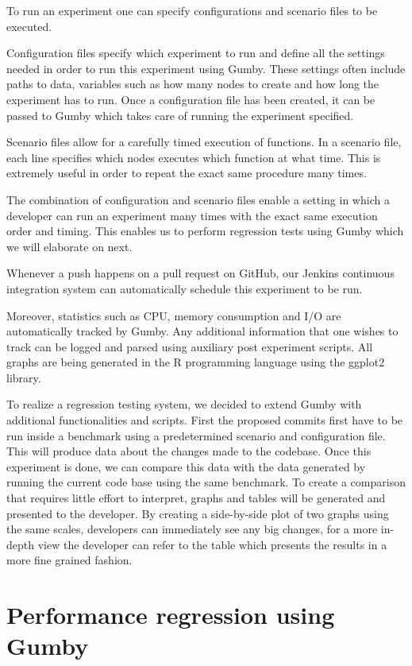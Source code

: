 To run an experiment one can specify configurations and scenario files to be executed.

Configuration files specify which experiment to run and define all the settings needed in order to run this experiment using Gumby.
These settings often include paths to data, variables such as how many nodes to create and how long the experiment has to run.
Once a configuration file has been created, it can be passed to Gumby which takes care of running the experiment specified.

Scenario files allow for a carefully timed execution of functions.
In a scenario file, each line specifies which nodes executes which function at what time.
This is extremely useful in order to repeat the exact same procedure many times.

The combination of configuration and scenario files enable a setting in which a developer can run an experiment many times with the exact same execution order and timing.
This enables us to perform regression tests using Gumby which we will elaborate on next.

Whenever a push happens on a pull request on GitHub, our Jenkins continuous integration system can automatically schedule this experiment to be run. 

Moreover, statistics such as CPU, memory consumption and I/O are automatically tracked by Gumby.
Any additional information that one wishes to track can be logged and parsed using auxiliary post experiment scripts.
All graphs are being generated in the R programming language using the ggplot2 library.

To realize a regression testing system, we decided to extend Gumby with additional functionalities and scripts.
First the proposed commits first have to be run inside a benchmark using a predetermined scenario and configuration file.
This will produce data about the changes made to the codebase.
Once this experiment is done, we can compare this data with the data generated by running the current code base using the same benchmark.
To create a comparison that requires little effort to interpret, graphs and tables will be generated and presented to the developer.
By creating a side-by-side plot of two graphs using the same scales, developers can immediately see any big changes, for a more in-depth view the developer can refer to the table which presents the results in a more fine grained fashion.

\section{Performance regression using Gumby}

